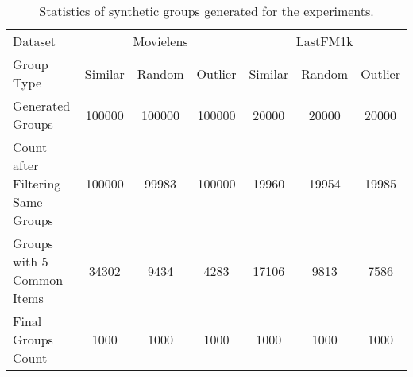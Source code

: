 \begin{table}
\caption{Statistics of synthetic groups generated for the experiments.}
\label{tab:synthetic_groups}
\begin{tabular}{lcccccc}
\toprule
Dataset & \multicolumn{3}{c}{Movielens} & \multicolumn{3}{c}{LastFM1k} \\
Group Type & Similar & Random & Outlier & Similar & Random & Outlier \\
\midrule
Generated Groups & 100000 & 100000 & 100000 & 20000 & 20000 & 20000 \\
Count after Filtering Same Groups & 100000 & 99983 & 100000 & 19960 & 19954 & 19985 \\
Groups with 5 Common Items & 34302 & 9434 & 4283 & 17106 & 9813 & 7586 \\
Final Groups Count & 1000 & 1000 & 1000 & 1000 & 1000 & 1000 \\
\bottomrule
\end{tabular}
\end{table}
